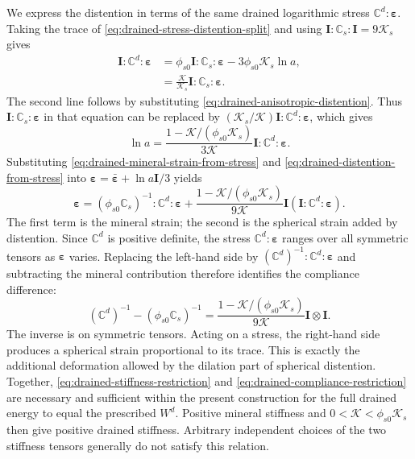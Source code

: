 We express the distention in terms of the same drained logarithmic
stress \(\mathbb{C}^d:\mathbf\varepsilon\). Taking the trace of
\eqref{eq:drained-stress-distention-split} and using
\(\mathbf I:\mathbb{C}_s:\mathbf I=9\mathcal{K}_s\) gives
\begin{align}
 \mathbf I:\mathbb{C}^d:\mathbf\varepsilon
 &=\phi_{s0}\mathbf I:\mathbb{C}_s:\mathbf\varepsilon
       -3\phi_{s0}\mathcal{K}_s\ln a,
 \label{eq:drained-logarithmic-stress-trace-split}\\
 &=\frac{\mathcal{K}}{\mathcal{K}_s}
       \mathbf I:\mathbb{C}_s:\mathbf\varepsilon.
 \label{eq:drained-logarithmic-stress-trace}
\end{align}
The second line follows by substituting
\eqref{eq:drained-anisotropic-distention}. Thus
\(\mathbf I:\mathbb{C}_s:\mathbf\varepsilon\) in that equation can be
replaced by
\((\mathcal{K}_s/\mathcal{K})\mathbf I:\mathbb{C}^d:\mathbf\varepsilon\),
which gives
\begin{equation}
 \ln a=\frac{1-\mathcal{K}/(\phi_{s0}\mathcal{K}_s)}{3\mathcal{K}}
             \mathbf I:\mathbb{C}^d:\mathbf\varepsilon.
 \label{eq:drained-distention-from-stress}
\end{equation}
Substituting \eqref{eq:drained-mineral-strain-from-stress} and
\eqref{eq:drained-distention-from-stress} into
\(\mathbf\varepsilon=\bar{\mathbf\varepsilon}+\ln a\mathbf I/3\)
yields
\begin{equation}
 \mathbf\varepsilon
 =(\phi_{s0}\mathbb{C}_s)^{-1}:\mathbb{C}^d:\mathbf\varepsilon
 +\frac{1-\mathcal{K}/(\phi_{s0}\mathcal{K}_s)}{9\mathcal{K}}
       \mathbf I\left(\mathbf I:\mathbb{C}^d:\mathbf\varepsilon\right).
 \label{eq:drained-compliance-work-derivation}
\end{equation}
The first term is the mineral strain; the second is the spherical strain
added by distention. Since \(\mathbb{C}^d\) is positive definite, the
stress \(\mathbb{C}^d:\mathbf\varepsilon\) ranges over all symmetric
tensors as \(\mathbf\varepsilon\) varies. Replacing the left-hand side
by \((\mathbb{C}^d)^{-1}:\mathbb{C}^d:\mathbf\varepsilon\) and
subtracting the mineral contribution therefore identifies the compliance
difference:
\begin{equation}
 (\mathbb{C}^d)^{-1}-(\phi_{s0}\mathbb{C}_s)^{-1}
 =\frac{1-\mathcal{K}/(\phi_{s0}\mathcal{K}_s)}{9\mathcal{K}}\mathbf I\otimes\mathbf I.
 \label{eq:drained-compliance-restriction}
\end{equation}
The inverse is on symmetric tensors. Acting on a stress, the right-hand
side produces a spherical strain proportional to its trace. This is exactly
the additional deformation allowed by the dilation part of spherical distention. Together, \eqref{eq:drained-stiffness-restriction} and
\eqref{eq:drained-compliance-restriction} are necessary and sufficient within
the present construction for the full drained energy to equal the prescribed
\(W^d\). Positive mineral stiffness
and \(0<\mathcal{K}<\phi_{s0}\mathcal{K}_s\) then give positive drained stiffness. Arbitrary
independent choices of the two stiffness tensors generally do not satisfy
this relation.
